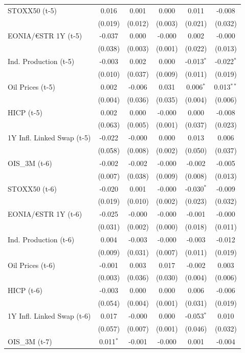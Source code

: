 \begin{longtable}[t]{lccccc}
STOXX50 (t-5) & 0.016 & 0.001 & 0.000 & 0.011 & -0.008\\
 & (0.019) & (0.012) & (0.003) & (0.021) & (0.032)\\
EONIA/€STR 1Y (t-5) & -0.037 & 0.000 & -0.000 & 0.002 & -0.000\\
 & (0.038) & (0.003) & (0.001) & (0.022) & (0.013)\\
Ind. Production (t-5) & -0.003 & 0.002 & 0.000 & -0.013$^{*}$ & -0.022$^{*}$\\
 & (0.010) & (0.037) & (0.009) & (0.011) & (0.019)\\
Oil Prices (t-5) & 0.002 & -0.006 & 0.031 & 0.006$^{*}$ & 0.013$^{**}$\\
 & (0.004) & (0.036) & (0.035) & (0.004) & (0.006)\\
HICP (t-5) & 0.002 & 0.000 & -0.000 & 0.000 & -0.008\\
 & (0.063) & (0.005) & (0.001) & (0.037) & (0.023)\\
1Y Infl. Linked Swap (t-5) & -0.022 & -0.000 & 0.000 & 0.013 & 0.006\\
 & (0.058) & (0.008) & (0.002) & (0.050) & (0.037)\\
OIS\_3M (t-6) & -0.002 & -0.002 & -0.000 & -0.002 & -0.005\\
 & (0.007) & (0.038) & (0.009) & (0.008) & (0.013)\\
STOXX50 (t-6) & -0.020 & 0.001 & -0.000 & -0.030$^{*}$ & -0.009\\
 & (0.019) & (0.010) & (0.002) & (0.023) & (0.032)\\
EONIA/€STR 1Y (t-6) & -0.025 & -0.000 & -0.000 & -0.001 & -0.000\\
 & (0.031) & (0.002) & (0.000) & (0.018) & (0.011)\\
Ind. Production (t-6) & 0.004 & -0.003 & -0.000 & -0.003 & -0.012\\
 & (0.009) & (0.031) & (0.007) & (0.011) & (0.019)\\
Oil Prices (t-6) & -0.001 & 0.003 & 0.017 & -0.002 & 0.003\\
 & (0.003) & (0.036) & (0.030) & (0.004) & (0.006)\\
HICP (t-6) & -0.003 & 0.000 & 0.000 & 0.006 & -0.006\\
 & (0.054) & (0.004) & (0.001) & (0.031) & (0.019)\\
1Y Infl. Linked Swap (t-6) & 0.017 & -0.000 & 0.000 & -0.053$^{*}$ & 0.010\\
 & (0.057) & (0.007) & (0.001) & (0.046) & (0.032)\\
OIS\_3M (t-7) & 0.011$^{*}$ & -0.001 & -0.000 & 0.001 & -0.004\\

\end{longtable}
